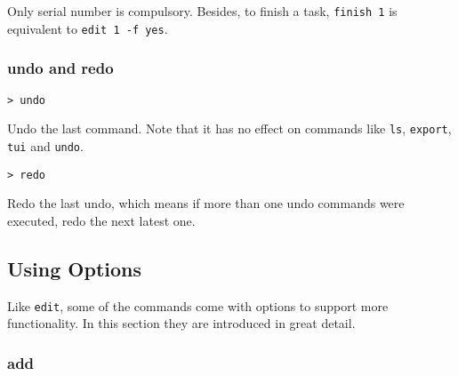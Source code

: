 \documentclass[12pt, a4paper]{article}
\begin{document}
Only serial number is compulsory. Besides, to finish a task, \texttt{finish 1} is equivalent to \texttt{edit 1 -f yes}.


\subsubsection{undo and redo}
\texttt{\textgreater \ undo}

Undo the last command. Note that it has no effect on commands like \texttt{ls}, \texttt{export}, \texttt{tui} and \texttt{undo}.

\texttt{\textgreater \ redo}

Redo the last undo, which means if more than one undo commands were executed, redo the next latest one.

\subsection{Using Options}

Like \texttt{edit}, some of the commands come with options to support more functionality.
In this section they are introduced in great detail.

\subsubsection{add}
\end{document}
